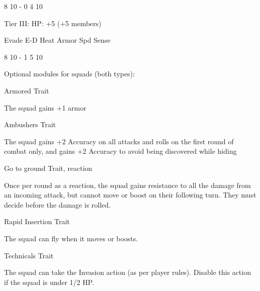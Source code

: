         8         10     -        0            4         10 

Tier III:  
HP: +5 (+5 members)
 

        Evade     E-D    Heat    Armor         Spd      Sense 

        8         10     -        1            5         10 

Optional modules for squads (both types): 
 
Armored  
Trait
 
The squad gains +1 armor
 

Ambushers  
Trait
 
The squad gains +2 Accuracy on all attacks and rolls on the first round of combat only, and gains  
+2 Accuracy to avoid being discovered while hiding
 

Go to ground  
Trait, reaction
 
Once per round as a reaction, the squad gains resistance to all the damage from an incoming  
attack, but cannot move or boost on their following turn. They must decide before the damage is  
rolled.
 

Rapid Insertion  
Trait
 
The squad can fly when it moves or boosts.
 

Technicals  
Trait
 
The squad can take the Invasion action (as per player rules). Disable this action if the squad is  
under 1/2 HP.
 

                                      